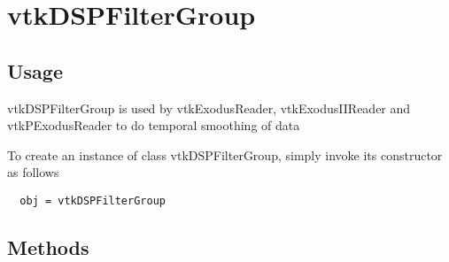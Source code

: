 \section{vtkDSPFilterGroup}

\subsection{Usage}

 vtkDSPFilterGroup is used by vtkExodusReader, vtkExodusIIReader and
 vtkPExodusReader to do temporal smoothing of data

To create an instance of class vtkDSPFilterGroup, simply
invoke its constructor as follows
\begin{verbatim}
  obj = vtkDSPFilterGroup
\end{verbatim}
\subsection{Methods}

